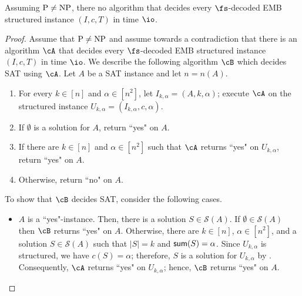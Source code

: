 		\begin{lemma}
				\label{lem:SAT}
				Assuming $\textnormal{P} \neq \textnormal{NP}$, there no algorithm that decides every $\fs$-decoded \textnormal{EMB} structured instance $(I,c,T)$ in time $\io$. 
			\end{lemma}
	\begin{proof}
	
	Assume that $\textnormal{P} \neq \textnormal{NP}$ and assume towards a contradiction that there is an algorithm $\cA$ that decides every $\fs$-decoded EMB structured instance $(I,c,T)$ in time $\io$. We describe the following algorithm $\cB$ which decides SAT using $\cA$. Let $A$ be a SAT instance and let $n = n(A)$. 
	\begin{enumerate}
		\item 	For every $k \in \left[n\right]$ and $\alpha \in \left[n^2\right]$, let $I_{k,\alpha} = (A,k,\alpha)$; execute $\cA$ on the structured instance $U_{k,\alpha} = (I_{k,\alpha},c,\alpha)$. %
		\item  If $\emptyset$ is a solution for $A$,  return ``yes" on $A$. 
		\item If there are $k \in \left[n\right]$ and $\alpha \in \left[n^2\right]$ such that $\cA$ returns ``yes" on $U_{k,\alpha}$, %
	 return ``yes" on $A$. %
	 \item Otherwise, return ``no" on $A$. %
	\end{enumerate}
	To show that $\cB$ decides SAT, consider the following cases. 
	\begin{itemize}
		\item $A$ is a ``yes"-instance. Then, there is a solution $S \in \mathcal{S}(A)$. If $\emptyset \in \mathcal{S}(A)$ then $\cB$ returns ``yes" on $A$. Otherwise, there are $k \in [n]$, $\alpha \in \left[n^2\right]$, and a solution $S \in \mathcal{S}(A)$ such that $|S| = k$ and $ \textnormal{\textsf{sum}}(S) = \alpha$. Since $U_{k,\alpha}$ is structured, we have $c(S) = \alpha$; therefore, $S$ is a solution for $U_{k,\alpha}$ by . Consequently, $\cA$ returns ``yes" on $U_{k,\alpha}$; hence, $\cB$ returns ``yes" on $A$.  
		
	
		

\end{itemize}
\end{proof}
